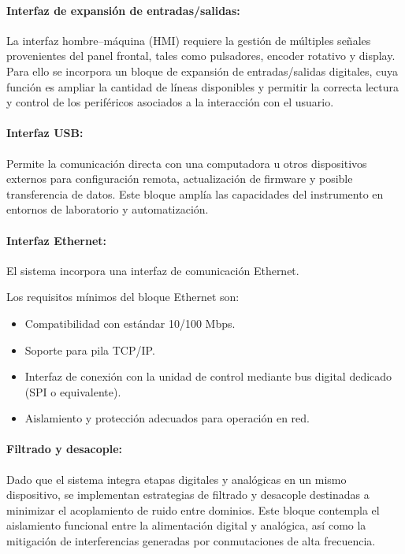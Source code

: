 \paragraph{Interfaz de expansión de entradas/salidas:}
La interfaz hombre–máquina (HMI) requiere la gestión de múltiples señales provenientes del panel frontal, tales como pulsadores, encoder rotativo y display. Para ello se incorpora un bloque de expansión de entradas/salidas digitales, cuya función es ampliar la cantidad de líneas disponibles y permitir la correcta lectura y control de los periféricos asociados a la interacción con el usuario.

\paragraph{Interfaz USB:}
Permite la comunicación directa con una computadora u otros dispositivos externos para configuración remota, actualización de firmware y posible transferencia de datos. Este bloque amplía las capacidades del instrumento en entornos de laboratorio y automatización.

\paragraph{Interfaz Ethernet:}
El sistema incorpora una interfaz de comunicación Ethernet.

Los requisitos mínimos del bloque Ethernet son:

\begin{itemize}[label=\textbullet]
	\item Compatibilidad con estándar 10/100 Mbps.
	\item Soporte para pila TCP/IP.
	\item Interfaz de conexión con la unidad de control mediante bus digital dedicado (SPI o equivalente).
	\item Aislamiento y protección adecuados para operación en red.
\end{itemize}

\paragraph{Filtrado y desacople:}
Dado que el sistema integra etapas digitales y analógicas en un mismo dispositivo, se implementan estrategias de filtrado y desacople destinadas a minimizar el acoplamiento de ruido entre dominios. Este bloque contempla el aislamiento funcional entre la alimentación digital y analógica, así como la mitigación de interferencias generadas por conmutaciones de alta frecuencia.

